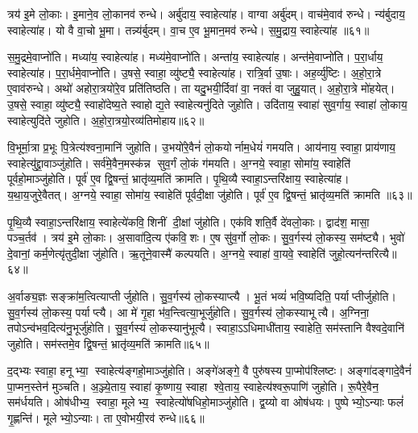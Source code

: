 त्रय॑ इ॒मे लो॒काः।
इ॒माने॒व लो॒कानव॑ रुन्धे।
अर्बु॑दाय॒ स्वाहेत्या॑ह।
वाग्वा अर्बु॑दम्।
वाच॑मे॒वाव॑ रुन्धे।
न्य॑र्बुदाय॒ स्वाहेत्या॑ह।
यो वै वा॒चो भू॒मा।
तन्न्य॑र्बुदम्।
वा॒च ए॒व भू॒मान॒मव॑ रुन्धे।
स॒मु॒द्राय॒ स्वाहेत्या॑ह ॥६१॥

स॒मु॒द्रमे॒वाप्नो॑ति।
मध्या॑य॒ स्वाहेत्या॑ह।
मध्य॑मे॒वाप्नो॑ति।
अन्ता॑य॒ स्वाहेत्या॑ह।
अन्त॑मे॒वाप्नो॑ति।
प॒रा॒र्धाय॒ स्वाहेत्या॑ह।
प॒रा॒र्धमे॒वाप्नो॑ति।
उ॒षसे॒ स्वाहा॒ व्यु॑ष्ट्यै॒ स्वाहेत्या॑ह।
रात्रि॒र्वा उ॒षाः।
अह॒र्व्यु॑ष्टिः।
अ॒हो॒रा॒त्रे ए॒वाव॑रुन्धे।
अथो॑ अहोरा॒त्रयो॑रे॒व प्रति॑तिष्ठति।
ता यदु॒भयी॒र्दिवा॑ वा॒ नक्तं॑ वा जुहु॒यात्।
अ॒हो॒रा॒त्रे मो॑हयेत्।
उ॒षसे॒ स्वाहा॒ व्यु॑ष्ट्यै॒ स्वाहो॑देष्य॒ते स्वाहोद्य॒ते स्वाहेत्यनु॑दिते जुहोति।
उदि॑ताय॒ स्वाहा॑ सुव॒र्गाय॒ स्वाहा॑ लो॒काय॒ स्वाहेत्युदि॑ते जुहोति।
अ॒हो॒रा॒त्रयो॒रव्य॑तिमोहाय॥६२॥\anuvakamend[ए॒को॒त्त॒रं जु॑होति प्र॒युता॑य॒ स्वाहेत्या॑ह समु॒द्राय॒ स्वाहेत्या॒हाह॒र्व्यु॑ष्टिः स॒प्त च॑]

वि॒भूर्मा॒त्रा प्र॒भूः पि॒त्रेत्य॑श्वना॒मानि॑ जुहोति।
उ॒भयो॑रे॒वैनं॑ लो॒कयोर्नाम॒धेयं॑ गमयति।
आय॑नाय॒ स्वाहा॒ प्राय॑णाय॒ स्वाहेत्यु॑द्द्रा॒वाञ्जु॑होति।
सर्व॑मे॒वैन॒मस्क॑न्न सुव॒र्गं लो॒कं ग॑मयति।
अ॒ग्नये॒ स्वाहा॒ सोमा॑य॒ स्वाहेति॑ पूर्वहो॒माञ्जु॑होति।
पूर्व॑ ए॒व द्वि॒षन्तं॒ भ्रातृ॑व्य॒मति॑ क्रामति।
पृ॒थि॒व्यै स्वाहा॒ऽन्तरि॑क्षाय॒ स्वाहेत्या॑ह।
य॒था॒य॒जुरे॒वैतत्।
अ॒ग्नये॒ स्वाहा॒ सोमा॑य॒ स्वाहेति॑ पूर्वदी॒क्षा जु॑होति।
पूर्व॑ ए॒व द्वि॒षन्तं॒ भ्रातृ॑व्य॒मति॑ क्रामति ॥६३॥

पृ॒थि॒व्यै स्वाहा॒ऽन्तरि॑क्षाय॒ स्वाहेत्ये॑कवि॒शिनीं दी॒क्षां जु॑होति।
एक॑विशति॒र्वै दे॑वलो॒काः।
द्वाद॑श॒ मासा॒ पञ्च॒र्तव॑।
त्रय॑ इ॒मे लो॒काः।
अ॒सावा॑दि॒त्य ए॑कवि॒शः।
ए॒ष सु॑व॒र्गो लो॒कः।
सु॒व॒र्गस्य॑ लो॒कस्य॒ सम॑ष्ट्यै।
भुवो॑ दे॒वानां॒ कर्म॒णेत्यृ॑तुदी॒क्षा जु॑होति।
ऋ॒तूने॒वास्मै॑ कल्पयति।
अ॒ग्नये॒ स्वाहा॑ वा॒यवे॒ स्वाहेति॑ जुहो॒त्यन॑न्तरित्यै॥६४॥

अ॒र्वाङ्य॒ज्ञः सङ्क्रा॑म॒त्वित्याप्तीर्जुहोति।
सु॒व॒र्गस्य॑ लो॒कस्याप्त्यै।
भू॒तं भव्यं॑ भवि॒ष्यदिति॒ पर्याप्तीर्जुहोति।
सु॒व॒र्गस्य॑ लो॒कस्य॒ पर्याप्त्यै।
आ मे॑ गृ॒हा भ॑व॒न्त्वित्या॒भूर्जु॑होति।
सु॒व॒र्गस्य॑ लो॒कस्याभूत्यै।
अ॒ग्निना॒ तपोऽन्व॑भव॒दित्य॑नु॒भूर्जु॑होति।
सु॒व॒र्गस्य॑ लो॒कस्यानु॑भूत्यै।
स्वाहा॒ऽऽधिमाधी॑ताय॒ स्वाहेति॒ सम॑स्तानि वैश्वदे॒वानि॑ जुहोति।
सम॑स्तमे॒व द्वि॒षन्तं॒ भ्रातृ॑व्य॒मति॑ क्रामति॥६५॥

द॒द्भ्यः स्वाहा॒ हनूभ्या॒ स्वाहेत्य॑ङ्गहो॒माञ्जु॑होति।
अङ्गे॑अङ्गे॒ वै पुरु॑षस्य पा॒प्मोप॑श्लिष्टः।
अङ्गा॑दङ्गादे॒वैनं॑ पा॒प्मन॒स्तेन॑ मुञ्चति।
अ॒ञ्ज्ये॒ताय॒ स्वाहा॑ कृ॒ष्णाय॒ स्वाहा श्वे॒ताय॒ स्वाहेत्य॑श्वरू॒पाणि॑ जुहोति।
रू॒पैरे॒वैन॒ सम॑र्धयति।
ओष॑धीभ्य॒ स्वाहा॒ मूलेभ्य॒ स्वाहेत्यो॑षधिहो॒माञ्जु॑होति।
द्व॒य्यो वा ओष॑धयः।
पुष्पेभ्यो॒ऽन्याः फलं॑ गृ॒ह्णन्ति॑।
मूलेभ्यो॒ऽन्याः।
ता ए॒वोभयी॒रव॑ रुन्धे॥६६॥

